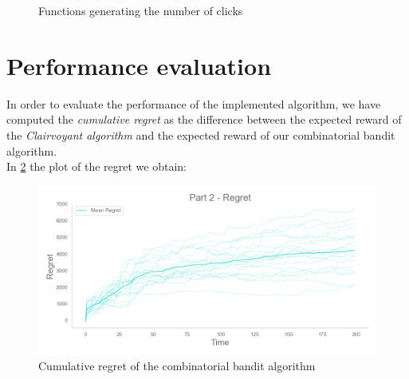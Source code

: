\begin{figure}[!htb]
    \caption{Functions generating the number of clicks}
    \label{curve2Fig}
\end{figure}


\section{Performance evaluation}
In order to evaluate the performance of the implemented algorithm, we have computed the \emph{cumulative regret} as the difference between the expected reward of the \textit{Clairvoyant algorithm} and the expected reward of our combinatorial bandit algorithm.\\
In \ref{regret2Fig} the plot of the regret we obtain:
\begin{figure}[!htb]
    \centering
    \includegraphics[width=\textwidth]{images/Part2_regret.png}
    \caption{Cumulative regret of the combinatorial bandit algorithm}
    \label{regret2Fig}
\end{figure}


